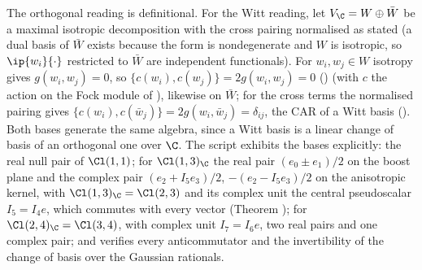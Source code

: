 The orthogonal reading is definitional. For the Witt reading, let $V_{\C} = W \oplus \bar{W}$ be a maximal isotropic decomposition with the cross pairing normalised as stated (a dual basis of $\bar{W}$ exists because the form is nondegenerate and $W$ is isotropic, so $\ip{w_{i}}{\cdot}$ restricted to $\bar{W}$ are independent functionals). For $w_{i}, w_{j} \in W$ isotropy gives $g(w_{i}, w_{j}) = 0$, so $\{c(w_{i}), c(w_{j})\} = 2g(w_{i}, w_{j}) = 0$ () (with $c$ the action on the Fock module of ), likewise on $\bar{W}$; for the cross terms the normalised pairing gives $\{c(w_{i}), c(\bar{w}_{j})\} = 2g(w_{i}, \bar{w}_{j}) = \delta_{ij}$, the CAR of a Witt basis (). Both bases generate the same algebra, since a Witt basis is a linear change of basis of an orthogonal one over $\C$. The script exhibits the bases explicitly: the real null pair of $\Cl(1,1)$; for $\Cl(1,3)_{\C}$ the real pair $(e_{0} \pm e_{1})/2$ on the boost plane and the complex pair $(e_{2} + I_{5}e_{3})/2$, $-(e_{2} - I_{5}e_{3})/2$ on the anisotropic kernel, with $\Cl(1,3)_{\C} = \Cl(2,3)$ and its complex unit the central pseudoscalar $I_{5} = I_{4}e$, which commutes with every vector (Theorem ); for $\Cl(2,4)_{\C} = \Cl(3,4)$, with complex unit $I_{7} = I_{6}e$, two real pairs and one complex pair; and verifies every anticommutator and the invertibility of the change of basis over the Gaussian rationals.
